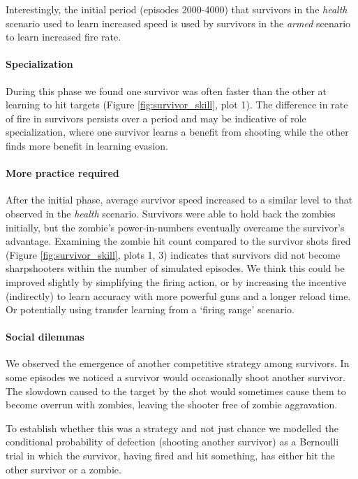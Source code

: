 \documentclass[11pt,a4paper]{article}
\begin{document}
Interestingly, the initial period (episodes 2000-4000) that survivors in the \emph{health} scenario used to learn increased speed
is used by survivors in the \emph{armed} scenario to learn increased fire rate.

\paragraph{Specialization}
During this phase we found one survivor was often faster than the other at learning to hit targets (Figure \ref{fig:survivor_skill}, plot 1).
The difference in rate of fire in survivors persists over a period and may be indicative of role specialization,
where one survivor learns a benefit from shooting while the other finds more benefit in learning evasion.

\paragraph{More practice required}
After the initial phase, average survivor speed increased to a similar level to that observed in the \emph{health} scenario.
Survivors were able to hold back the zombies initially, but the zombie's power-in-numbers eventually overcame the survivor's advantage.
Examining the zombie hit count compared to the survivor shots fired (Figure \ref{fig:survivor_skill}, plots 1, 3)
indicates that survivors did not become sharpshooters within the number of simulated episodes.
We think this could be improved slightly by simplifying the firing action, or by increasing the incentive (indirectly) to learn accuracy with more powerful guns and a longer reload time.
Or potentially using transfer learning from a `firing range' scenario.

\paragraph{Social dilemmas}
We observed the emergence of another competitive strategy among survivors.
In some episodes we noticed a survivor would occasionally shoot another survivor.
The slowdown caused to the target by the shot would sometimes cause them to become overrun with zombies,
leaving the shooter free of zombie aggravation.

To establish whether this was a strategy and not just chance
we modelled the conditional probability of defection (shooting another survivor) as a Bernoulli trial
in which the survivor, having fired and hit something, has either hit the other survivor or a zombie.
\end{document}
